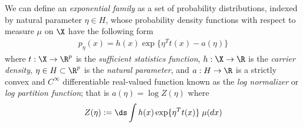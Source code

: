 \begin{definition}
We can define an \textit{exponential family} as a set of probability distributions, indexed by natural parameter $\eta \in H$,%
 whose probability density functions with respect to measure $\mu$ on $\X$ have the following form
\begin{align}
 p_\eta(x) = h(x) \exp \{ \eta^T t(x) - a(\eta)\} 
\label{eqn:exponential_family_natural}
 \end{align}
where $t : \X \to \R^p$ is the \textit{sufficient statistics function}, $h : \X \to \R$ is the \textit{carrier density}, $\eta \in H \subset \R^p$ is the \textit{natural parameter},  and $a : H \to \R$ is a strictly convex and $C^{\infty}$ differentiable real-valued function known as the \textit{log normalizer} or \textit{log partition function};  that is $a(\eta) = \log Z(\eta)$ where 
\begin{equation}
\label{eqn:partition_function}
 Z(\eta) := \ds\int  h(x) \exp \{ \eta^T t(x)  \} \; \mu(dx)	
\end{equation}



\end{definition}
